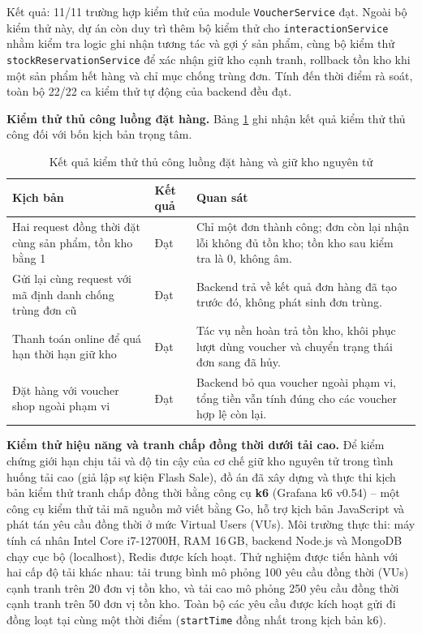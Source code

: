 \documentclass[../DoAn.tex]{subfiles}
\begin{document}
Kết quả: 11/11 trường hợp kiểm thử của module \texttt{VoucherService} đạt. Ngoài bộ kiểm thử này, dự án còn duy trì thêm bộ kiểm thử cho \texttt{interactionService} nhằm kiểm tra logic ghi nhận tương tác và gợi ý sản phẩm, cùng bộ kiểm thử \texttt{stockReservationService} để xác nhận giữ kho cạnh tranh, rollback tồn kho khi một sản phẩm hết hàng và chỉ mục chống trùng đơn. Tính đến thời điểm rà soát, toàn bộ 22/22 ca kiểm thử tự động của backend đều đạt.

\textbf{Kiểm thử thủ công luồng đặt hàng.} Bảng \ref{table:manual_test} ghi nhận kết quả kiểm thử thủ công đối với bốn kịch bản trọng tâm.

\begin{table}[H]
    \centering
    \caption{Kết quả kiểm thử thủ công luồng đặt hàng và giữ kho nguyên tử}
    \label{table:manual_test}
    \small
    \setlength{\tabcolsep}{3pt}
    \begin{tabular}{|>{\raggedright\arraybackslash}p{4.0cm}|>{\centering\arraybackslash}p{1.4cm}|>{\raggedright\arraybackslash}p{7.2cm}|}
        \hline
        \textbf{Kịch bản} & \textbf{Kết quả} & \textbf{Quan sát} \\ \hline
        Hai request đồng thời đặt cùng sản phẩm, tồn kho bằng 1 & Đạt & Chỉ một đơn thành công; đơn còn lại nhận lỗi không đủ tồn kho; tồn kho sau kiểm tra là 0, không âm. \\ \hline
        Gửi lại cùng request với mã định danh chống trùng đơn cũ & Đạt & Backend trả về kết quả đơn hàng đã tạo trước đó, không phát sinh đơn trùng. \\ \hline
        Thanh toán online để quá hạn thời hạn giữ kho & Đạt & Tác vụ nền hoàn trả tồn kho, khôi phục lượt dùng voucher và chuyển trạng thái đơn sang đã hủy. \\ \hline
        Đặt hàng với voucher shop ngoài phạm vi & Đạt & Backend bỏ qua voucher ngoài phạm vi, tổng tiền vẫn tính đúng cho các voucher hợp lệ còn lại. \\ \hline
    \end{tabular}
\end{table}

\textbf{Kiểm thử hiệu năng và tranh chấp đồng thời dưới tải cao.} Để kiểm chứng giới hạn chịu tải và độ tin cậy của cơ chế giữ kho nguyên tử trong tình huống tải cao (giả lập sự kiện Flash Sale), đồ án đã xây dựng và thực thi kịch bản kiểm thử tranh chấp đồng thời bằng công cụ \textbf{k6} (Grafana k6 v0.54) -- một công cụ kiểm thử tải mã nguồn mở viết bằng Go, hỗ trợ kịch bản JavaScript và phát tán yêu cầu đồng thời ở mức Virtual Users (VUs). Môi trường thực thi: máy tính cá nhân Intel Core i7-12700H, RAM 16\,GB, backend Node.js và MongoDB chạy cục bộ (localhost), Redis được kích hoạt. Thử nghiệm được tiến hành với hai cấp độ tải khác nhau: tải trung bình mô phỏng 100 yêu cầu đồng thời (VUs) cạnh tranh trên 20 đơn vị tồn kho, và tải cao mô phỏng 250 yêu cầu đồng thời cạnh tranh trên 50 đơn vị tồn kho. Toàn bộ các yêu cầu được kích hoạt gửi đi đồng loạt tại cùng một thời điểm (\texttt{startTime} đồng nhất trong kịch bản k6).
\end{document}
